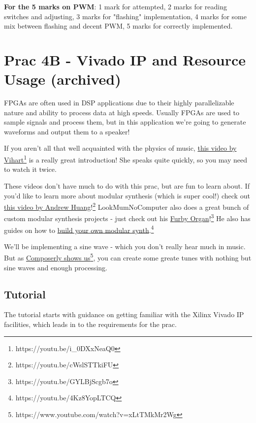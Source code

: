 \textbf{For the 5 marks on PWM}: 1 mark for attempted, 2 marks for reading switches and adjusting, 3 marks for "flashing" implementation, 4 marks for some mix between flashing and decent PWM, 5 marks for correctly implemented.





\section{Prac 4B - Vivado IP and Resource Usage (archived)}
\label{sec:Prac4}
FPGAs are often used in DSP applications due to their highly parallelizable nature and ability to process data at high speeds. Usually FPGAs are used to sample signals and process them, but in this application we're going to generate waveforms and output them to a speaker!

If you aren't all that well acquainted with the physics of music, \href{https://www.youtube.com/watch?v=i_0DXxNeaQ0}{this video by Vihart}\footnote{https://youtu.be/i\_0DXxNeaQ0} is a really great introduction! She speaks quite quickly, so you may need to watch it twice.

These videos don't have much to do with this prac, but are fun to learn about. If you'd like to learn more about modular synthesis (which is super cool!) check out \href{https://www.youtube.com/watch?v=cWslSTTkiFU}{this video by Andrew Huang}!\footnote{https://youtu.be/cWslSTTkiFU} LookMumNoComputer also does a great bunch of custom modular synthesis projects - just check out his \href{https://youtu.be/GYLBjScgb7o}{Furby Organ}!\footnote{https://youtu.be/GYLBjScgb7o} He also has guides on how to \href{https://www.youtube.com/watch?v=4Kz8YopLTCQ&list=PLluPQLh1xzlIzqgTBwTo_a5k_O63JxwjQ}{build your own modular synth}.\footnote{https://youtu.be/4Kz8YopLTCQ}

We'll be implementing a sine wave - which you don't really hear much in music. But as \href{https://www.youtube.com/watch?v=xLtTMkMr2Wg}{Composerly shows us}\footnote{https://www.youtube.com/watch?v=xLtTMkMr2Wg}, you can create some greate tunes with nothing but sine waves and enough processing.

\subsection{Tutorial}
The tutorial starts with guidance on getting familiar with the Xilinx Vivado IP facilities, which leads in to the requirements for the prac. 

